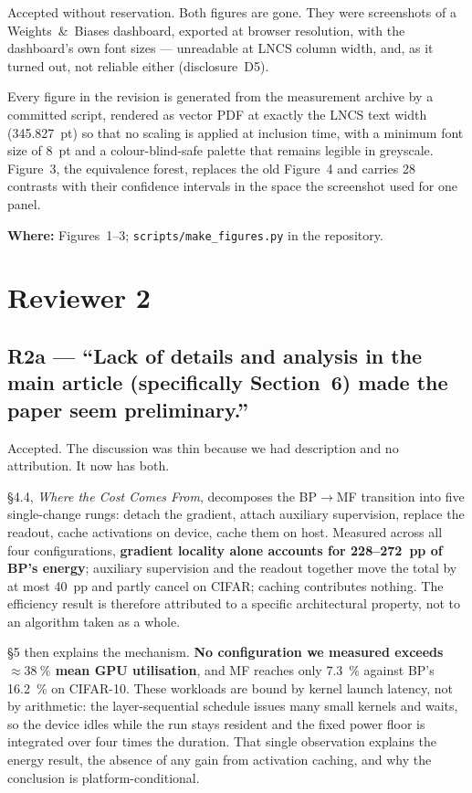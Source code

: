\documentclass[11pt,a4paper]{article}
\newcommand{\MF}{MF}
\newcommand{\BP}{BP}
\newcommand{\where}[1]{\par\smallskip\noindent\textbf{Where:} #1\par}
\begin{document}
Accepted without reservation. Both figures are gone. They were screenshots of
a Weights~\&~Biases dashboard, exported at browser resolution, with the
dashboard's own font sizes --- unreadable at LNCS column width, and, as it
turned out, not reliable either (disclosure~D5).

Every figure in the revision is generated from the measurement archive by a
committed script, rendered as vector PDF at exactly the LNCS text width
(\num{345.827}~pt) so that no scaling is applied at inclusion time, with a
minimum font size of \num{8}~pt and a colour-blind-safe palette that remains
legible in greyscale. Figure~3, the equivalence forest, replaces the old
Figure~4 and carries \num{28} contrasts with their confidence intervals in the
space the screenshot used for one panel.

\where{Figures~1--3; \texttt{scripts/make\_figures.py} in the repository.}

\section*{Reviewer 2}

\subsection*{R2a --- ``Lack of details and analysis in the main article
(specifically Section~6) made the paper seem preliminary.''}

Accepted. The discussion was thin because we had description and no
attribution. It now has both.

\S4.4, \emph{Where the Cost Comes From}, decomposes the \BP{}$\to$\MF{}
transition into five single-change rungs: detach the gradient, attach
auxiliary supervision, replace the readout, cache activations on device, cache
them on host. Measured across all four configurations, \textbf{gradient
locality alone accounts for \numrange{228}{272}~pp of \BP{}'s energy};
auxiliary supervision and the readout together move the total by at most
\num{40}~pp and partly cancel on CIFAR; caching contributes nothing. The
efficiency result is therefore attributed to a specific architectural
property, not to an algorithm taken as a whole.

\S5 then explains the mechanism. \textbf{No configuration we measured exceeds
${\approx}\SI{38}{\percent}$ mean GPU utilisation}, and \MF{} reaches only
\SI{7.3}{\percent} against \BP{}'s \SI{16.2}{\percent} on CIFAR-10. These
workloads are bound by kernel launch latency, not by arithmetic: the
layer-sequential schedule issues many small kernels and waits, so the device
idles while the run stays resident and the fixed power floor is integrated
over four times the duration. That single observation explains the energy
result, the absence of any gain from activation caching, and why the
conclusion is platform-conditional.
\end{document}
